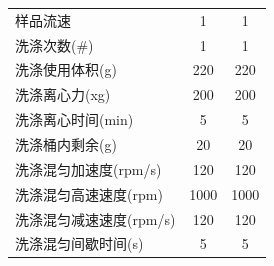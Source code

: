\documentclass[UTF8,10pt,a4paper,fontset=fandol]{ctexart}
\newcommand{\fieldvalue}[1]{#1}
\begin{document}
\begin{tabularx}{\textwidth}{@{}>{\raggedright\arraybackslash}Xcc@{}}
样品流速 &
\fieldvalue{1} &
\fieldvalue{1} \\

洗涤次数(\#) &
\fieldvalue{1} &
\fieldvalue{1} \\

洗涤使用体积(g) &
\fieldvalue{220} &
\fieldvalue{220} \\

洗涤离心力(xg) &
\fieldvalue{200} &
\fieldvalue{200} \\

洗涤离心时间(min) &
\fieldvalue{5} &
\fieldvalue{5} \\

洗涤桶内剩余(g) &
\fieldvalue{20} &
\fieldvalue{20} \\

洗涤混匀加速度(rpm/s) &
\fieldvalue{120} &
\fieldvalue{120} \\

洗涤混匀高速速度(rpm) &
\fieldvalue{1000} &
\fieldvalue{1000} \\

洗涤混匀减速速度(rpm/s) &
\fieldvalue{120} &
\fieldvalue{120} \\

洗涤混匀间歇时间(s) &
\fieldvalue{5} &
\fieldvalue{5} \\


\end{tabularx}
\end{document}
